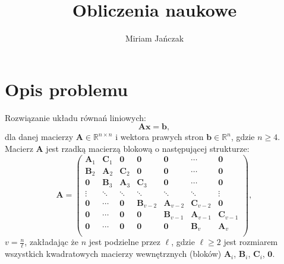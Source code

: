 \documentclass{mk-polish-lab-report}
\author{Miriam Jańczak}
\title{Obliczenia naukowe}
\newcommand{\mA}{\bm{A}}
\newcommand{\mB}{\bm{B}}
\newcommand{\mC}{\bm{C}}
\newcommand{\mZ}{\bm{0}}
\newcommand{\vb}{\bm{b}}
\newcommand{\vx}{\bm{x}}
\newcommand{\R}{\mathbb{R}}
\begin{document}
\maketitle

\section{Opis problemu}

Rozwiązanie układu równań liniowych:
\begin{equation}
\mA\vx = \vb,
\label{eq:uklad}
\end{equation} 
dla danej macierzy $\mA \in \R^{n\times n}$ 
i wektora prawych stron $\vb \in \R^n$, gdzie $n \geq 4$. \\

\noindent Macierz $\mA$ jest rzadką macierzą blokową o następującej strukturze:
\begin{equation}
\mA =
\left(\begin{array}{ccccccc}
\mA_1 & \mC_1 & \mZ & \mZ & \mZ & \cdots & \mZ \\
\mB_2 & \mA_2 & \mC_2 & \mZ & \mZ  & \cdots & \mZ \\
\mZ  & \mB_3 & \mA_3 & \mC_3 & \mZ  & \cdots & \mZ \\
\vdots & \ddots & \ddots & \ddots & \ddots & \ddots & \vdots\\
\mZ   & \cdots & \mZ  & \mB_{v-2} & \mA_{v-2} & \mC_{v-2} & \mZ \\
\mZ  & \cdots & \mZ  &  \mZ &\mB_{v-1} & \mA_{v-1} & \mC_{v-1}  \\
\mZ  & \cdots & \mZ & \mZ & \mZ& \mB_{v} & \mA_{v}  \\
\end{array}\right),
\label{eq:postac}
\end{equation} 
$v = \frac{n}{\ell}$, zakładając że $n$ jest podzielne przez $\ell$, gdzie $\ell \geq 2$ jest rozmiarem wszystkich kwadratowych macierzy wewnętrznych (bloków) $\mA_i$, $\mB_i$, $\mC_i$, $\mZ$. \\
\end{document}
